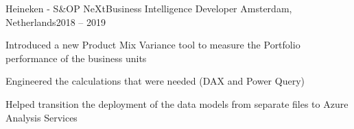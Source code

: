 \resumeProject
  {Heineken - S\&OP NeXt}{Business Intelligence Developer}
  {Amsterdam, Netherlands}{2018 – 2019}
  \resumeItemListStart
\item Introduced a new Product Mix Variance tool to measure the Portfolio performance of the business units
\item Engineered the calculations that were needed (DAX and Power Query)
\item Helped transition the deployment of the data models from separate files to Azure Analysis Services
  \resumeItemListEnd 